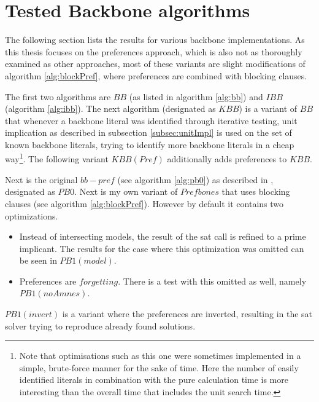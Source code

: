\section{Tested Backbone algorithms}

The following section lists the results for various backbone implementations. As this thesis focuses on the preferences approach, which is also not as thoroughly examined as other approaches, most of these variants are slight modifications of algorithm \ref{alg:blockPref}, where preferences are combined with blocking clauses.

The first two algorithms are $BB$ (as listed in algorithm \ref{alg:bb}) and $IBB$ (algorithm \ref{alg:ibb}). The next algorithm (designated as $KBB$) is a variant of $BB$ that whenever a backbone literal was identified through iterative testing, unit implication as described in subsection \ref{subsec:unitImpl} is used on the set of known backbone literals, trying to identify more backbone literals in a cheap way\footnote{
	Note that optimisations such as this one were sometimes implemented in a simple, brute-force manner for the sake of time. Here the number of easily identified literals in combination with the pure calculation time is more interesting than the overall time that includes the unit search time.
}. 
The following variant $KBB(Pref)$ additionally adds preferences to $KBB$. 

Next is the original $bb-pref$ (see algorithm \ref{alg:pb0}) as described in \cite{PJ18}, designated as $PB0$. Next is my own variant of $Prefbones$ that uses blocking clauses (see algorithm \ref{alg:blockPref}). However by default it contains two optimizations.
\begin{itemize}
\item Instead of intersecting models, the result of the sat call is refined to a prime implicant. The results for the case where this optimization was omitted can be seen in $PB1(model)$.
\item Preferences are $forgetting$. There is a test with this omitted as well, namely $PB1(noAmnes)$.
\end{itemize}

$PB1(invert)$ is a variant where the preferences are inverted, resulting in the sat solver trying to reproduce already found solutions.






